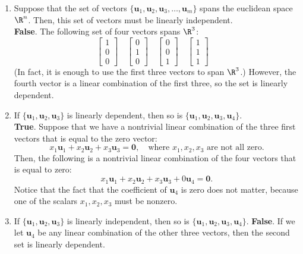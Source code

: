 \documentclass[12pt]{article}
\begin{document}
\begin{enumerate}
\item Suppose that the set of vectors $\{\mathbf{u}_1, \mathbf{u}_2, \mathbf{u}_3,\ldots ,\mathbf{u}_m\}$ spans the euclidean space $\R^n$. Then, this set of vectors must be linearly independent.\\
\textbf{False}. The following set of four vectors spans $\R^3$:
\[
\left[\begin{matrix} 1 \\ 0 \\ 0 \end{matrix}\right]\quad
\left[\begin{matrix} 0 \\ 1 \\ 0 \end{matrix}\right]\quad
\left[\begin{matrix} 0 \\ 0 \\ 1 \end{matrix}\right]\quad
\left[\begin{matrix} 1 \\ 1 \\ 1 \end{matrix}\right]\quad
\]
(In fact, it is enough to use the first three vectors to span $\R^3$.) However, the fourth vector is a linear combination of the first three, so the set is linearly dependent.

\item If $\{\mathbf{u}_1, \mathbf{u}_2, \mathbf{u}_3\}$ is linearly dependent, then so is $\{\mathbf{u}_1, \mathbf{u}_2, \mathbf{u}_3, \mathbf{u}_4\}$.\\
\textbf{True}. Suppose that we have a nontrivial linear combination of the three first vectors that is equal to the zero vector:
\[
x_1\mathbf{u}_1+x_2\mathbf{u}_2+x_3\mathbf{u}_3=\mathbf{0},\quad\text{where $x_1, x_2, x_3$ are not all zero}.
\]
Then, the following is a nontrivial linear combination of the four vectors that is equal to zero:
\[
x_1\mathbf{u}_1+x_2\mathbf{u}_2+x_3\mathbf{u}_3+0\mathbf{u}_4=\mathbf{0}.
\]
Notice that the fact that the coefficient of $\mathbf{u}_4$ is zero does not matter, because one of the scalars $x_1,x_2,x_3$ must be nonzero.

\item If $\{\mathbf{u}_1, \mathbf{u}_2, \mathbf{u}_3\}$ is linearly independent, then so is $\{\mathbf{u}_1, \mathbf{u}_2, \mathbf{u}_3, \mathbf{u}_4\}$.
\textbf{False}. If we let $\mathbf{u}_4$ be any linear combination of the other three vectors, then the second set is linearly dependent.


\end{enumerate}
\end{document}
